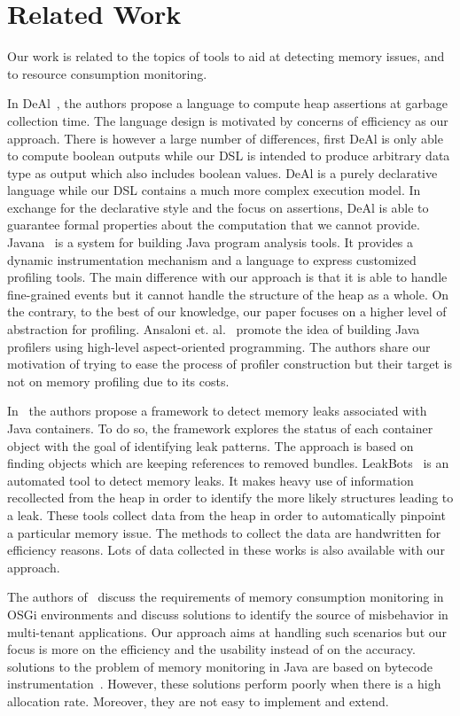 \section{Related Work}\label{sec:relatedwork}
Our work is related to the topics of tools to aid at detecting memory issues, and to resource consumption monitoring.

In DeAl~\cite{Reichenbach:2010:GCE:1869459.1869482}, the authors propose a language to compute heap assertions at garbage collection time.
The language design is motivated by concerns of efficiency as our approach.
There is however a large number of differences, first DeAl is only able to compute boolean outputs while our DSL is intended to produce arbitrary data type as output which also includes boolean values.
DeAl is a purely declarative language while our DSL contains a much more complex execution model.
In exchange for the declarative style and the focus on assertions, DeAl is able to guarantee formal properties about the computation that we cannot provide. 
Javana~\cite{Maebe06javana:a} is a system for building Java program analysis tools. It provides a dynamic instrumentation mechanism and a language to express customized profiling tools.
The main difference with our
approach is that it is able to handle fine-grained events but it cannot handle the structure of the heap as a whole.
On the contrary, to the best of our knowledge, our paper focuses on a higher level of abstraction for profiling.
Ansaloni et. al.~\cite{Ansaloni:2010:RDE:1712605.1712616} promote the idea of building Java profilers using high-level aspect-oriented programming.
The authors share our motivation of trying to ease the process of profiler construction but their target is not on memory profiling due to its costs.

In~\cite{Xu:2013:PML:2491509.2491511} the authors propose a framework to detect memory leaks associated with Java containers.
To do so, the framework explores the status of each container object with the goal of identifying leak patterns. The approach is based on finding objects which are keeping references to removed bundles. LeakBots~\cite{Mitchell03leakbot:an} is an automated tool to detect memory leaks. It makes heavy
use of information recollected from the heap in order to identify the more likely structures leading to a leak.
These tools collect data from the heap in order to automatically pinpoint a particular memory issue.
The methods to collect the data are handwritten for efficiency reasons.
Lots of data collected in these works is also available with our approach.

The authors of~\cite{Attouchi:2014:MMM:2602458.2602467} discuss the requirements of memory consumption monitoring in OSGi environments and discuss solutions to identify the source of misbehavior in multi-tenant applications. Our approach aims at handling such scenarios but our focus is more on the efficiency and the usability instead of on the accuracy.
 solutions to the problem of memory monitoring in Java are based on bytecode instrumentation~\cite{binder_extending_2005, binder_portable_2001}.
However, these solutions perform poorly when there is a high allocation rate. Moreover, they are not easy to implement and extend.

